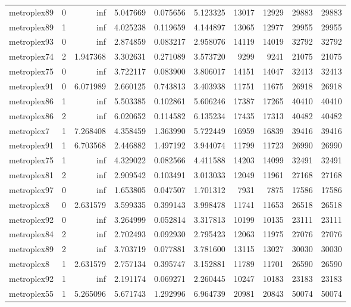 \begin{longtable}{|l|r|r|r|r|r|r|r|r|r|}
metroplex89 & 0 & inf & 5.047669 & 0.075656 & 5.123325 & 13017 & 12929 & 29883 & 29883 \\
metroplex89 & 1 & inf & 4.025238 & 0.119659 & 4.144897 & 13065 & 12977 & 29955 & 29955 \\
metroplex93 & 0 & inf & 2.874859 & 0.083217 & 2.958076 & 14119 & 14019 & 32792 & 32792 \\
metroplex74 & 2 & 1.947368 & 3.302631 & 0.271089 & 3.573720 & 9299 & 9241 & 21075 & 21075 \\
metroplex75 & 0 & inf & 3.722117 & 0.083900 & 3.806017 & 14151 & 14047 & 32413 & 32413 \\
metroplex91 & 0 & 6.071989 & 2.660125 & 0.743813 & 3.403938 & 11751 & 11675 & 26918 & 26918 \\
metroplex86 & 1 & inf & 5.503385 & 0.102861 & 5.606246 & 17387 & 17265 & 40410 & 40410 \\
metroplex86 & 2 & inf & 6.020652 & 0.114582 & 6.135234 & 17435 & 17313 & 40482 & 40482 \\
metroplex7 & 1 & 7.268408 & 4.358459 & 1.363990 & 5.722449 & 16959 & 16839 & 39416 & 39416 \\
metroplex91 & 1 & 6.703568 & 2.446882 & 1.497192 & 3.944074 & 11799 & 11723 & 26990 & 26990 \\
metroplex75 & 1 & inf & 4.329022 & 0.082566 & 4.411588 & 14203 & 14099 & 32491 & 32491 \\
metroplex81 & 2 & inf & 2.909542 & 0.103491 & 3.013033 & 12049 & 11961 & 27168 & 27168 \\
metroplex97 & 0 & inf & 1.653805 & 0.047507 & 1.701312 & 7931 & 7875 & 17586 & 17586 \\
metroplex8 & 0 & 2.631579 & 3.599335 & 0.399143 & 3.998478 & 11741 & 11653 & 26518 & 26518 \\
metroplex92 & 0 & inf & 3.264999 & 0.052814 & 3.317813 & 10199 & 10135 & 23111 & 23111 \\
metroplex84 & 2 & inf & 2.702493 & 0.092930 & 2.795423 & 12063 & 11975 & 27076 & 27076 \\
metroplex89 & 2 & inf & 3.703719 & 0.077881 & 3.781600 & 13115 & 13027 & 30030 & 30030 \\
metroplex8 & 1 & 2.631579 & 2.757134 & 0.395747 & 3.152881 & 11789 & 11701 & 26590 & 26590 \\
metroplex92 & 1 & inf & 2.191174 & 0.069271 & 2.260445 & 10247 & 10183 & 23183 & 23183 \\
metroplex55 & 1 & 5.265096 & 5.671743 & 1.292996 & 6.964739 & 20981 & 20843 & 50074 & 50074 \\

\end{longtable}
